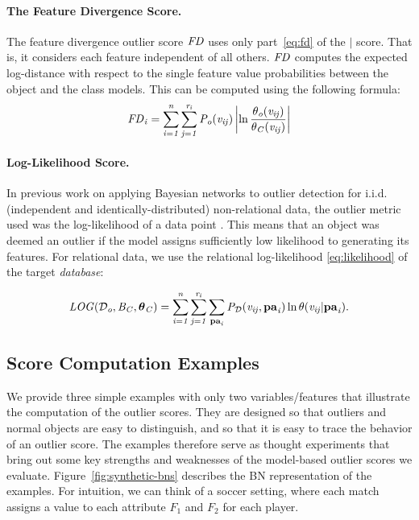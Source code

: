 {\paragraph{The Feature Divergence Score.}
The feature divergence outlier score $\it{FD}$ uses only part~\eqref{eq:fd} of the $\mid$ score. That is, it considers each feature independent of all others.  $\it{FD}$ computes the expected log-distance with respect to  the single feature value probabilities between the object and the class models. This can be computed using the following formula:
\begin{equation}
\it{FD}_{i}	=\sum_{i=1}^{n}\sum_{j=1}^{r_{i}} P_{o}( v_{ij}) \left|\ln \frac{\theta_{o}( v_{ij})}{\theta_{C}( v_{ij})}\right|
\end{equation}


\paragraph{Log-Likelihood Score.} 

In previous work on applying Bayesian networks to outlier detection for i.i.d. (independent and identically-distributed) non-relational data, the outlier metric used was the log-likelihood of a data point \citep{Cansado2008}. This means that an object was deemed an outlier if the model assigns sufficiently low likelihood to generating its features. For relational data, we use the relational log-likelihood \eqref{eq:likelihood} of the target {\em database}:

\begin{equation} \label{eq:loglikelihood-score}
\it{LOG}(\mathcal{D}_{o},B_{C},\boldsymbol{\theta}_{C}) =   \sum_{i=1}^{n}\sum_{j=1}^{r_{i}} \sum_{\mathbf{pa}_{i}}P_{\mathcal{D}}(v_{ij},\mathbf{pa}_{i})\ln \theta(v_{ij}|\mathbf{pa}_{i}).
\end{equation}




\subsection{Score Computation Examples} \label{sec:divergence-examples} 
			
			
			We provide three simple examples with only two variables/features that illustrate the computation of the outlier scores. They are designed so that outliers and normal objects are easy to distinguish, and so that it is easy to trace the behavior of an outlier score.
			The examples therefore serve as thought experiments that bring out some key strengths and weaknesses of the model-based outlier scores we evaluate. 
			Figure~\ref{fig:synthetic-bns} describes the BN representation of the examples. For intuition, we can think of a soccer setting, where each match assigns a value to each attribute $F_{1}$ and $F_{2}$ for each player. 
			
}
